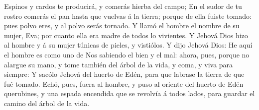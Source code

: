 Espinos y cardos te producirá, y comerás hierba del campo; 
En el sudor de tu rostro comerás el pan hasta que vuelvas á la tierra; porque de ella fuiste tomado: pues polvo eres, y al polvo serás tornado. 
Y llamó el hombre el nombre de su mujer, Eva; por cuanto ella era madre de todos lo vivientes. 
Y Jehová Dios hizo al hombre y á su mujer túnicas de pieles, y vistiólos. 
Y dijo Jehová Dios: He aquí el hombre es como uno de Nos sabiendo el bien y el mal: ahora, pues, porque no alargue su mano, y tome también del árbol de la vida, y coma, y viva para siempre: 
Y sacólo Jehová del huerto de Edén, para que labrase la tierra de que fué tomado. 
Echó, pues, fuera al hombre, y puso al oriente del huerto de Edén querubines, y una espada encendida que se revolvía á todos lados, para guardar el camino del árbol de la vida. 





